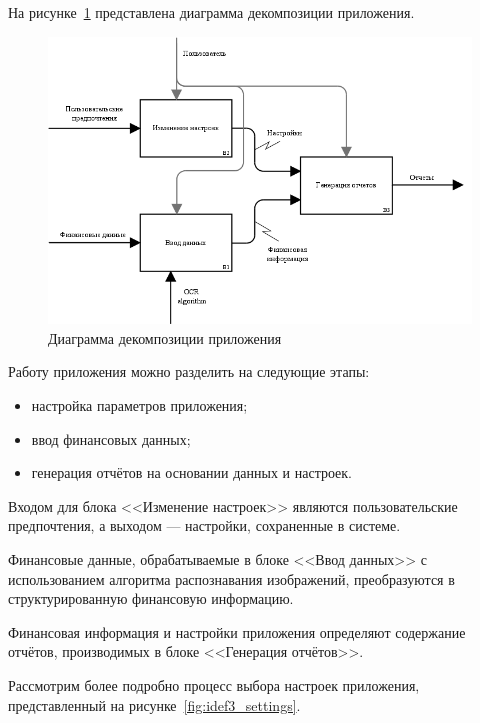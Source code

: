 \pagebreak
На рисунке~\ref{fig:idef0_app} представлена диаграмма декомпозиции
приложения.

\begin{figure}[h!]
  \centering
  \includegraphics[width=150mm]{pic/idef0_app}
  \caption{Диаграмма декомпозиции приложения}
  \label{fig:idef0_app}
\end{figure}

Работу приложения можно разделить на следующие этапы:
\begin{itemize}
\item настройка параметров приложения;
\item ввод финансовых данных;
\item генерация отчётов на основании данных и настроек.
\end{itemize}

Входом для блока <<Изменение настроек>> являются пользовательские
предпочтения, а выходом --- настройки, сохраненные в системе.

Финансовые данные, обрабатываемые в блоке <<Ввод данных>>
с использованием алгоритма распознавания изображений,
преобразуются в структурированную финансовую информацию.

Финансовая информация и настройки приложения определяют содержание
отчётов, производимых в блоке <<Генерация отчётов>>.

\pagebreak
Рассмотрим более подробно процесс выбора настроек приложения,
представленный на рисунке~\ref{fig:idef3_settings}.

